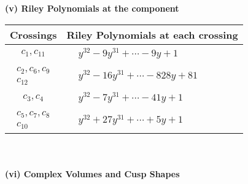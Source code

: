 \documentclass[1p]{elsarticle_modified}
\theoremstyle{definition}
\begin{document}
\newpage\renewcommand{\arraystretch}{1}
\flushleft \textbf{(v) Riley Polynomials at the component}\newline \\
\begin{tabular}{m{50pt}|m{274pt}}
Crossings & \hspace{64pt}Riley Polynomials at each crossing \\
\hline $$\begin{aligned}c_{1},c_{11}\end{aligned}$$&$\begin{aligned}
&y^{32}-9 y^{31}+\cdots-9 y+1
\end{aligned}$\\
\hline $$\begin{aligned}c_{2},c_{6},c_{9}\\c_{12}\end{aligned}$$&$\begin{aligned}
&y^{32}-16 y^{31}+\cdots-828 y+81
\end{aligned}$\\
\hline $$\begin{aligned}c_{3},c_{4}\end{aligned}$$&$\begin{aligned}
&y^{32}-7 y^{31}+\cdots-41 y+1
\end{aligned}$\\
\hline $$\begin{aligned}c_{5},c_{7},c_{8}\\c_{10}\end{aligned}$$&$\begin{aligned}
&y^{32}+27 y^{31}+\cdots+5 y+1
\end{aligned}$\\
\hline
\end{tabular}\\~\\
\newpage\flushleft \textbf{(vi) Complex Volumes and Cusp Shapes}
\end{document}
